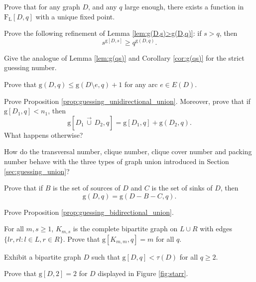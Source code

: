 \documentclass[a4paper, 11pt]{book}
\numberwithin{equation}{section}
\theoremstyle{plain}
\newcommand{\feedback}{\tau}
\newcommand{\vcup}{\,\vec{\cup}\,}
\newcommand{\linear}[1]{#1_\mathrm{L}}
\newcommand{\functions}{\mathrm{F}}
\newcommand{\linearFunctions}{\linear{\functions}}
\newcommand{\guessing}{\mathrm{g}}
\renewcommand{\(}{\ldbrack}
\renewcommand{\)}{\rdbrack}
\begin{document}
\begin{exercises}
\item Prove that for any graph $D$, and any $q$ large enough, there exists a function in $\linearFunctions[D,q]$ with a unique fixed point.

\item Prove the following refinement of Lemma \ref{lem:g(D,s)>g(D,q)}: if $s > q$, then
\[
	s^{\guessing[D, s]} \ge q^{\guessing(D,q)}.
\]

\item Give the analogue of Lemma \ref{lem:g(qs)} and Corollary \ref{cor:g(qs)} for the strict guessing number.


\item Prove that $\guessing(D, q) \le \guessing(D \setminus e, q) + 1$ for any arc $e \in E(D)$.

\item Prove Proposition \ref{prop:guessing_unidirectional_union}. Moreover, prove that if $\guessing[D_1, q] < n_1$, then
\[
	\guessing[D_1 \vcup D_2, q] = \guessing[D_1, q] + \guessing(D_2, q).
\]
What happens otherwise?


\item How do the transversal number, clique number, clique cover number and packing number behave with the three types of graph union introduced in Section \ref{sec:guessing_union}?


\item Prove that if $B$ is the set of sources of $D$ and $C$ is the set of sinks of $D$, then 
\[
	\guessing(D,q) = \guessing(D-B-C, q).
\]

\item Prove Proposition \ref{prop:guessing_bidirectional_union}.

\item For all $m,s \ge 1$, $K_{m,s}$ is the complete bipartite graph on $L \cup R$ with edges $\{lr, rl : l \in L, r \in R\}$. Prove that $\guessing[K_{m,m}, q] = m$ for all $q$.

\item Exhibit a bipartite graph $D$ such that $\guessing[D,q] < \feedback(D)$ for all $q \ge 2$.

\item \label{exerc:starr} Prove that $\guessing[D,2] = 2$ for $D$ displayed in Figure \ref{fig:starr}. 

\begin{figure}[!htp]
\centering
{}
\end{figure}
\end{exercises}
\end{document}
